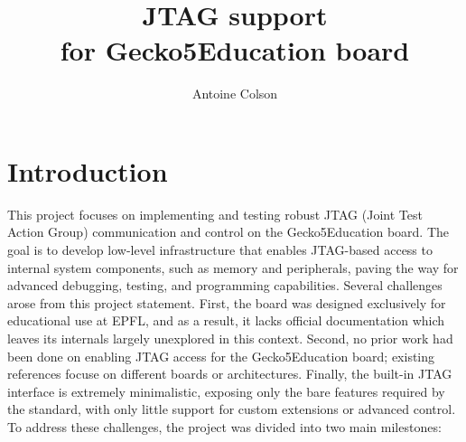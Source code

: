 \documentclass[a4paper,11pt,oneside]{report}
\title{JTAG support \\for Gecko5Education board}
\author{Antoine Colson}
\newcommand{\boardName}{Gecko5Education \xspace}
\begin{document}
\maketitle




\maketoc

\chapter{Introduction}

    This project focuses on implementing and testing robust JTAG (Joint Test Action Group) communication 
and control on the \boardName board. The goal is to develop 
low-level infrastructure that enables JTAG-based access to internal system components, 
such as memory and peripherals, paving the way for advanced debugging, testing, and programming capabilities.
Several challenges arose from this project statement.
First, the board was designed exclusively for educational use at EPFL, and as a result, it lacks official documentation which leaves its internals largely unexplored in this context. 
Second, no prior work had been done on enabling JTAG access for the \boardName board; existing references focuse on different boards or architectures. 
Finally, the built-in JTAG interface is extremely minimalistic, exposing only the bare features required by the standard, with only little support for custom extensions or advanced control.\\

To address these challenges, the project was divided into two main milestones: 
\end{document}
